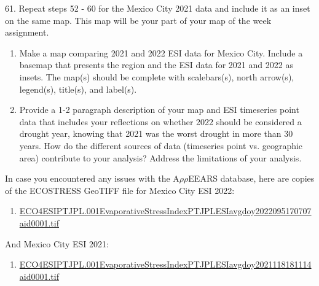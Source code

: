 \documentclass[oneside,a4paper,11pt,explicit]{book}
\begin{document}
61. Repeat steps 52 - 60 for the Mexico City 2021 data and include it as an inset on the same map. This map will be your part of your map of the week assignment.

\begin{tcolorbox}[colback=yellow!5!white,colframe=IceCreamOrbit,title= \vspace{.2em} \Large Map of the Week Assignments]
	\large
	\begin{enumerate}
		\item Make a map comparing 2021 and 2022 ESI data for Mexico City. Include a basemap that presents the region and the ESI data for 2021 and 2022 as insets. The map(s) should be complete with scalebars(s), north arrow(s), legend(s), title(s), and label(s).
        \item Provide a 1-2 paragraph description of your map and ESI timeseries point data that includes your reflections on whether 2022 should be considered a drought year, knowing that 2021 was the worst drought in more than 30 years. How do the different sources of data (timeseries point vs. geographic area) contribute to your analysis? Address the limitations of your analysis.
	\end{enumerate}
\end{tcolorbox}

\begin{tcolorbox}[colback=yellow!5!white,title=\textbf{Datafiles}]
	\large
	In case you encountered any issues with the A$\rho\rho$EEARS database, here are copies of the ECOSTRESS GeoTIFF file for Mexico City ESI 2022:
	\begin{enumerate}
		\item \href{https://jeremydforsythe.github.io/icecream-tutorials/Tutorial11_ESI/ECO4ESIPTJPL.001_Evaporative_Stress_Index_PT_JPL_ESIavg_doy2022095170707_aid0001.tif}{\small ECO4ESIPTJPL.001\textunderscore Evaporative\textunderscore Stress\textunderscore Index\textunderscore PT\textunderscore JPL\textunderscore ESIavg\textunderscore doy2022095170707\textunderscore aid0001.tif}
	\end{enumerate}
	And Mexico City ESI 2021:
	\begin{enumerate}
		\item \href{https://jeremydforsythe.github.io/icecream-tutorials/Tutorial11_ESI/ECO4ESIPTJPL.001_Evaporative_Stress_Index_PT_JPL_ESIavg_doy2021118181114_aid0001.tif}{\small ECO4ESIPTJPL.001\textunderscore Evaporative\textunderscore Stress\textunderscore Index\textunderscore PT\textunderscore JPL\textunderscore ESIavg\textunderscore doy2021118181114\textunderscore aid0001.tif}
	\end{enumerate}
\end{tcolorbox}
\end{document}
